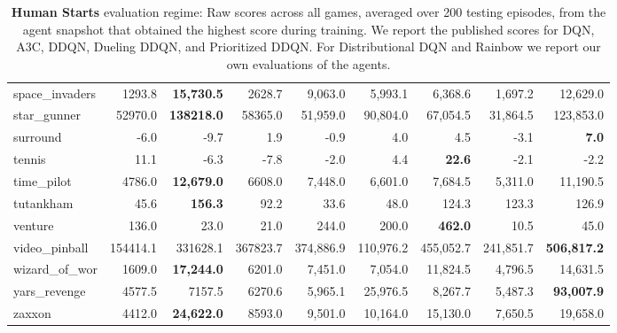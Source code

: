\documentclass[letterpaper]{article} \usepackage{aaai18}  \usepackage{times}  \usepackage{helvet}  \usepackage{courier}  \usepackage{url}  \usepackage{graphicx}  \usepackage{amsmath,amssymb}
\begin{document}
\begin{table*}[t]
{\begin{tabular}{l|rrrrrrrr}
    space\_invaders &    1293.8 &   {\bf 15,730.5 }&    2628.7 &     9,063.0 &    5,993.1 &        6,368.6 &    1,697.2 &   12,629.0 \\
       star\_gunner &   52970.0 & {\bf  138218.0 }&   58365.0 &    51,959.0 &   90,804.0 &       67,054.5 &   31,864.5 &  123,853.0 \\
          surround &      -6.0 &      -9.7 &       1.9 &        -0.9 &        4.0 &            4.5 &       -3.1 &      {\bf   7.0} \\
            tennis &      11.1 &      -6.3 &      -7.8 &        -2.0 &        4.4 &          {\bf  22.6 }&       -2.1 &       -2.2 \\
        time\_pilot &    4786.0 &  {\bf  12,679.0} &    6608.0 &     7,448.0 &    6,601.0 &        7,684.5 &    5,311.0 &   11,190.5 \\
         tutankham &      45.6 &    {\bf  156.3 }&      92.2 &        33.6 &       48.0 &          124.3 &      123.3 &      126.9 \\
           venture &     136.0 &      23.0 &      21.0 &       244.0 &      200.0 &          {\bf 462.0} &       10.5 &       45.0 \\
     video\_pinball &  154414.1 &  331628.1 &  367823.7 &   374,886.9 &  110,976.2 &      455,052.7 &  241,851.7 & {\bf  506,817.2 }\\
     wizard\_of\_wor &    1609.0 &   {\bf 17,244.0 } &    6201.0 &     7,451.0 &    7,054.0 &       11,824.5 &    4,796.5 &   14,631.5 \\
      yars\_revenge &    4577.5 &    7157.5 &    6270.6 &     5,965.1 &   25,976.5 &        8,267.7 &    5,487.3 &   {\bf 93,007.9 }\\
            zaxxon &    4412.0 &  {\bf  24,622.0} &    8593.0 &     9,501.0 &   10,164.0 &       15,130.0 &    7,650.5 &   19,658.0 \\
\bottomrule
\end{tabular}
}
\caption{\textbf{Human Starts} evaluation regime: Raw scores across all games, averaged over 200 testing episodes, from the agent snapshot that obtained the highest score during training. We report the published scores for DQN, A3C, DDQN, Dueling DDQN, and Prioritized DDQN. For Distributional DQN and Rainbow we report our own evaluations of the agents.}
\label{tab:hs}
\end{table*}
\end{document}
